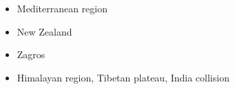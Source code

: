 \begin{itemize}
\item Mediterranean region 
{\scriptsize
\cite{pimo97}\cite{nesg97}
\cite{nesb99}
\cite{wosp00}
\cite{pimo03}
\cite{spwo04}
\cite{wogs09}
\cite{bofb10}\cite{fabe10}
\cite{chsv14}\cite{chsg14}\cite{vavs14}\cite{mafv14}
\cite{mesj16}
\cite{spcv18}
\cite{blgf20}
}
\item {New Zealand} 
{\scriptsize
\cite{koon90}
\cite{brbe95}
\cite{bekh96}
\cite{wabb98}
\cite{babr99}
\cite{gedh02}\cite{pybf02}
\cite{gehd03}\cite{konc03}\cite{upke03}
\cite{libi06}
\cite{pyeg10}\cite{spgs10a}
\cite{grel12}
\cite{sths13}
}
\item {Zagros} 
{\scriptsize
\cite{vech06}
\cite{hamo10}
\cite{yakm11}
\cite{nipc13}
\cite{frba14}
\cite{ghbu14}
\cite{coyc16}
\cite{rugb17}
}
\item {Himalayan region, Tibetan plateau, India collision} 


\end{itemize}
